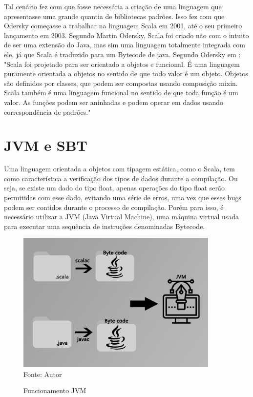 	Tal cenário fez com que fosse necessária a criação de uma linguagem que apresentasse uma grande quantia de bibliotecas padrões. Isso fez com que Odersky começasse a trabalhar na linguagem Scala em 2001, até o seu primeiro lançamento em 2003. Segundo Martin Odersky, Scala foi criado não com o intuito de ser uma extensão do Java, mas sim uma linguagem totalmente integrada com ele, já que Scala é traduzido para um Bytecode de java. Segundo Odersky em \cite{Venners}: "Scala foi projetado para ser orientado a objetos e funcional. É uma linguagem puramente orientada a objetos no sentido de que todo valor é um objeto. Objetos são definidos por classes, que podem ser compostas usando composição mixin. Scala também é uma linguagem funcional no sentido de que toda função é um valor. As funções podem ser aninhadas e podem operar em dados usando correspondência de padrões."
	
	
	
	
	\section{JVM e SBT}
	Uma linguagem orientada a objetos com tipagem estática, como o Scala, tem como característica a verificação dos tipos de dados durante a compilação. Ou seja, se existe um dado do tipo float, apenas operações do tipo float serão permitidas com esse dado, evitando uma série de erros, uma vez que esses bugs podem ser contidos durante o processo de compilação. Porém para isso, é necessário utilizar a JVM (Java Virtual Machine), uma máquina virtual usada para executar uma sequência de instruções denominadas Bytecode.
	
	\begin{figure}[H]
		\centering
		\caption{Funcionamento JVM}
		\label{Byte Code}
		\includegraphics[width=10cm]{JVM.jpg} \\
		Fonte: Autor
	\end{figure}
	
